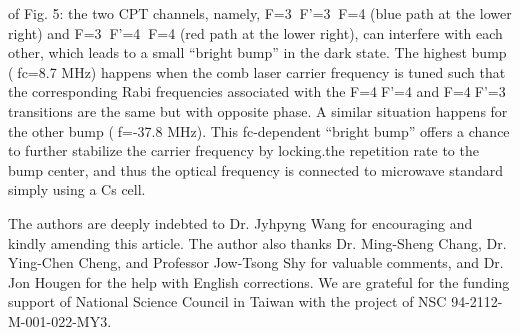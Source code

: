\documentclass[%
reprint,  
aps,
prl,
showpacs,
preprint,
]{revtex4}
\begin{document}
of Fig. 5: the two CPT channels, namely, F=3F’=3F=4 (blue path at the lower right) 
and F=3F’=4F=4 (red path at the lower right), can interfere with each other, 
which leads to a small ``bright bump'' in the dark state. The highest bump (fc=8.7 MHz) 
happens when the comb laser carrier frequency is tuned such that the corresponding Rabi 
frequencies associated with the F=4F’=4 and F=4F’=3 transitions are the same but with 
opposite phase.  A similar situation happens for the other bump (f=-37.8 MHz). This 
fc-dependent ``bright bump'' offers a chance to further stabilize the carrier frequency 
by locking.the repetition rate to the bump center, and thus the optical frequency is 
connected to microwave standard simply using a Cs cell.    

The authors are deeply indebted to Dr. Jyhpyng Wang for encouraging and kindly 
amending this article.  The author also thanks Dr. Ming-Sheng Chang, Dr. Ying-Chen Cheng, 
and Professor Jow-Tsong Shy for valuable comments, and Dr. Jon Hougen for the help 
with English corrections. We are grateful for the funding support of National 
Science Council in Taiwan with the project of NSC 94-2112-M-001-022-MY3.
\end{document}
